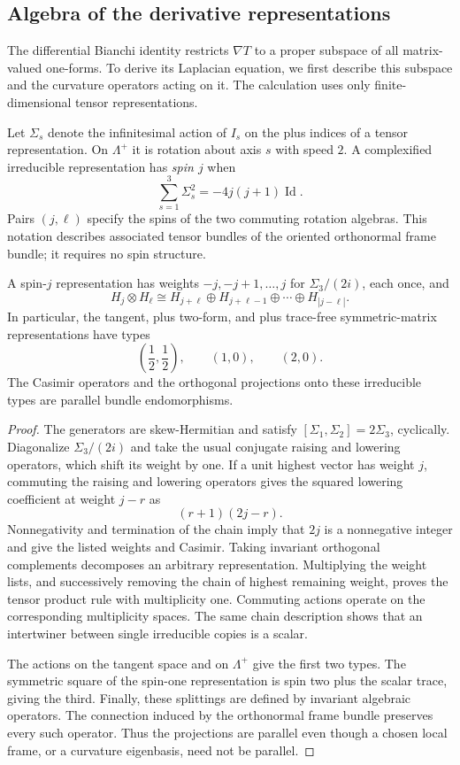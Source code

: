\subsection{Algebra of the derivative representations}

The differential Bianchi identity restricts $\nabla T$ to a proper
subspace of all matrix-valued one-forms. To derive its Laplacian equation,
we first describe this subspace and the curvature operators acting on it.
The calculation uses only finite-dimensional tensor representations.

Let $\Sigma_s$ denote the infinitesimal action of $I_s$ on the plus
indices of a tensor representation. On $\Lambda^+$ it is rotation
about axis $s$ with speed $2$. A complexified irreducible representation
has \emph{spin $j$} when
\[
 \sum_{s=1}^3\Sigma_s^2=-4j(j+1)\operatorname{Id}.
\]
Pairs $(j,\ell)$ specify the spins of the two commuting rotation
algebras. This notation describes associated tensor bundles of the
oriented orthonormal frame bundle; it requires no spin structure.

\begin{lemma}
\label{lem:spin-algebra}
A spin-$j$ representation has weights
$-j,-j+1,\ldots,j$ for $\Sigma_3/(2i)$, each once, and
\[
 H_j\otimes H_\ell
 \cong H_{j+\ell}\oplus H_{j+\ell-1}\oplus\cdots\oplus H_{|j-\ell|}.
\]
In particular, the tangent, plus two-form, and plus trace-free
symmetric-matrix representations have types
\[
 \left(\frac12,\frac12\right),\qquad (1,0),\qquad (2,0).
\]
The Casimir operators and the orthogonal projections onto these
irreducible types are parallel bundle endomorphisms.
\end{lemma}

\begin{proof}
The generators are skew-Hermitian and satisfy
$[\Sigma_1,\Sigma_2]=2\Sigma_3$, cyclically. Diagonalize
$\Sigma_3/(2i)$ and take the usual conjugate raising and lowering
operators, which shift its weight by one. If a unit highest vector
has weight $j$, commuting the raising and lowering operators gives
the squared lowering coefficient at weight $j-r$ as
\[
 (r+1)(2j-r).
\]
Nonnegativity and termination of the chain imply that $2j$ is a
nonnegative integer and give the listed weights and Casimir.
Taking invariant orthogonal complements decomposes an arbitrary
representation. Multiplying the weight lists, and successively
removing the chain of highest remaining weight, proves the tensor
product rule with multiplicity one. Commuting actions operate on the
corresponding multiplicity spaces. The same chain description shows
that an intertwiner between single irreducible copies is a scalar.

The actions on the tangent space and on $\Lambda^+$ give the first
two types. The symmetric square of the spin-one representation is
spin two plus the scalar trace, giving the third. Finally, these
splittings are defined by invariant algebraic operators. The
connection induced by the orthonormal frame bundle preserves every
such operator. Thus the projections are parallel even though a
chosen local frame, or a curvature eigenbasis, need not be parallel.
\end{proof}

